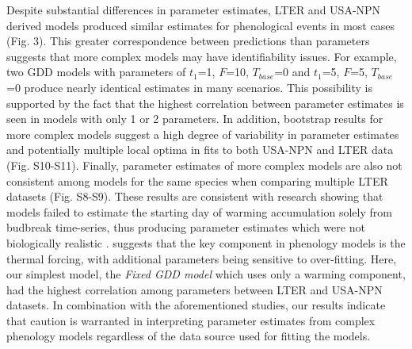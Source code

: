 \documentclass[fleqn,12pt,lineno]{article}
\begin{document}
Despite substantial differences in parameter estimates, LTER and USA-NPN derived models produced similar estimates for phenological events in most cases (Fig. 3). This greater correspondence between predictions than parameters suggests that more complex models may have identifiability issues. For example, two GDD models with parameters of $t_{1}$=1, $F$=10, $T_{base}$=0 and $t_{1}$=5, $F$=5, $T_{base}$=0 produce nearly identical estimates in many scenarios. This possibility is supported by the fact that the highest correlation between parameter estimates is seen in models with only 1 or 2 parameters. In addition, bootstrap results for more complex models suggest a high degree of variability in parameter estimates and potentially multiple local optima in fits to both USA-NPN and LTER data (Fig. S10-S11). Finally, parameter estimates of more complex models are also not consistent among models for the same species when comparing multiple LTER datasets (Fig. S8-S9). These results are consistent with research showing that models failed to estimate the starting day of warming accumulation solely from budbreak time-series, thus producing parameter estimates which were not biologically realistic \citep{chuine2016}. \cite{basler2016} suggests that the key component in phenology models is the thermal forcing, with additional parameters being sensitive to over-fitting. Here, our simplest model, the \textit{Fixed GDD model} which uses only a warming component, had the highest correlation among parameters between LTER and USA-NPN datasets. In combination with the aforementioned studies, our results indicate that caution is warranted in interpreting parameter estimates from complex phenology models regardless of the data source used for fitting the models.
\end{document}
